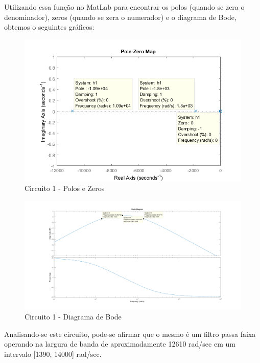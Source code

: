 \documentclass[a4paper, 12pt]{article}
\begin{document}
			Utilizando essa função no MatLab para encontrar os polos (quando se zera o denominador), zeros (quando se zera o numerador) e o diagrama de Bode, obtemos o seguintes gráficos:
			\newpage
			\begin{figure}[!ht]
				\centering
				\includegraphics[scale=0.7]{img/1e_circ1.png}
				\caption{Circuito 1 - Polos e Zeros}
			\end{figure}

			\begin{figure}[!ht]
				\centering
				\includegraphics[scale=0.3]{img/1f_circ1.png}
				\caption{Circuito 1 - Diagrama de Bode}
			\end{figure}

			Analisando-se este circuito, pode-se afirmar que o mesmo é um filtro passa faixa operando na largura de banda de aproximadamente 12610 rad/sec em um intervalo [1390, 14000] rad/sec.
			\newpage
\end{document}
